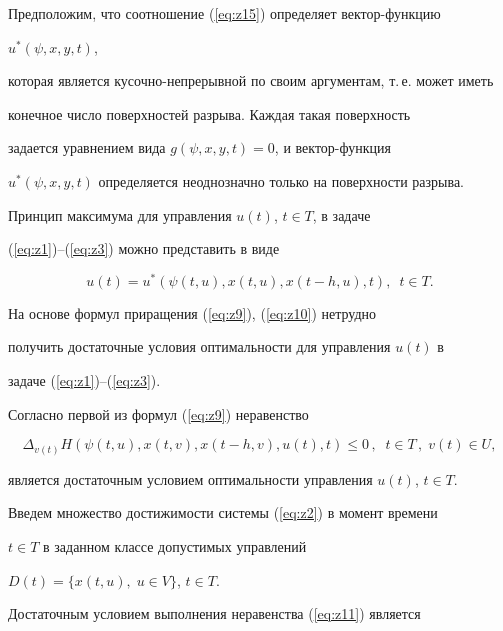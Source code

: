 Предположим, что соотношение (\ref{eq:z15}) определяет вектор-функцию


$u^*(\psi,x,y,t)$,


которая является кусочно-непрерывной по своим аргументам, т.\,е. может иметь


конечное число поверхностей разрыва. Каждая такая поверхность


задается уравнением вида $g(\psi,x,y,t)=0$, и вектор-функция


$u^*(\psi,x,y,t)$ определяется неоднозначно только на поверхности разрыва.





Принцип максимума для управления $u(t)$, $t\in T$, в задаче


(\ref{eq:z1})--(\ref{eq:z3}) можно представить в виде


$$


u(t)=u^*(\psi(t,u),x(t,u),x(t-h,u),t),\ \;t\in T.


$$





На основе формул приращения (\ref{eq:z9}), (\ref{eq:z10}) нетрудно


получить достаточные условия оптимальности для управления $u(t)$ в


задаче (\ref{eq:z1})--(\ref{eq:z3}).





Согласно первой из формул (\ref{eq:z9}) неравенство


\begin{equation}


\Delta_{v(t)}H(\psi(t,u),x(t,v),x(t-h,v),u(t),t)


\leq 0\,,\;\;t\in T\,,\;v(t)\in U,


\label{eq:z11}


\end{equation}


является достаточным условием оптимальности управления $u(t)$, $t\in T$.





Введем множество достижимости системы (\ref{eq:z2}) в момент времени


$t\in T$ в заданном классе допустимых управлений


$D(t)=\{ x(t,u),\;u\in V\}$, $t\in T$.


Достаточным условием выполнения неравенства (\ref{eq:z11}) является


